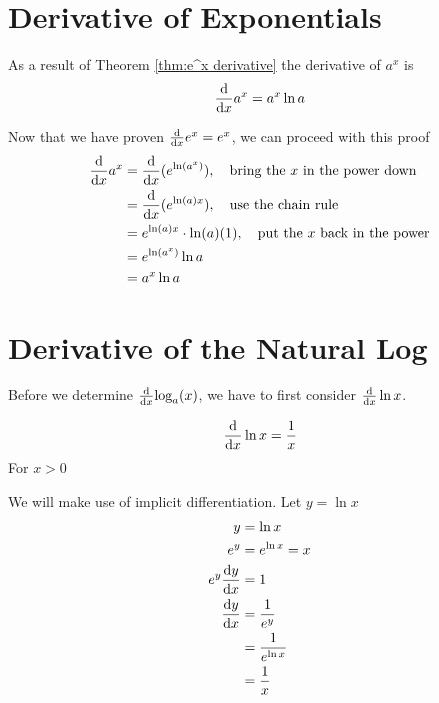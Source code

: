 \documentclass[working]{tuftebook}
\begin{document}
\section{Derivative of Exponentials}
\begin{theorem}
    As a result of Theorem \ref{thm:e^x derivative} the derivative of $a^x$ is 
    \[
        \dv{}{x}a^x=a^x \ln a
    \]
\end{theorem}
\begin{myproof}
    Now that we have proven $ \dv{}{x}e^x=e^x$, we can proceed with this proof
    \begin{align*}
        \dv{}{x}a^x&= \dv{}{x}\/(e^{ \ln(a^x)}),\quad \text{bring the $x$ in the power down}\\
                   &= \dv{}{x}\/(e^{ \ln (a)x}),\quad \text{use the chain rule}\\
                   &= e^{ \ln (a)x}\cdot \ln(a)(1),\quad \text{put the $x$ back in the power}\\ 
                   &=e^{ \ln (a^x)}\ln a\\ 
                   &=a^x \ln a
    \end{align*}
\end{myproof}

\section{Derivative of the Natural Log}
\label{sec:derivative-of-the-natural-log}
Before we determine $ \dv{}{x} \text{log}_{a}(x)$, we have to first consider $ \dv{}{x} \ln x$. 
\begin{theorem}
    \[
        \dv{}{x} \ln x= \frac{1}{x}
    \]
    For $x>0$
\end{theorem}
\vspace{-3em}
\begin{myproof}
    We will make use of implicit differentiation. Let $y= \ln x$
    \begin{align*}
        y&=\ln x\\
        e^y&=e^{ \ln x}=x\\ 
        e^y\dv{y}{x}&=1\\ 
        \dv{y}{x}&= \frac{1}{e^y}\\ 
                 &= \frac{1}{e^{ \ln x}}\\ 
                 &= \frac{1}{x}
    \end{align*}
\end{myproof}
\end{document}
